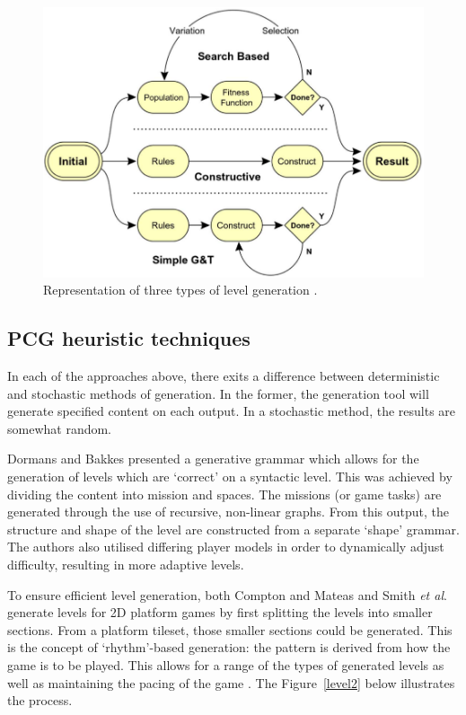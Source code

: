 \documentclass[11pt, a4paper, oneside]{report} %
\begin{document}
\begin{figure}[h!]

  \centering
    \includegraphics[scale=0.35]{lvlgenmethods}
  \caption{Representation of three types of level generation \cite{5756645}.}
  \label{level}
\end{figure}


\subsection{PCG heuristic techniques}

In each of the approaches above, there exits a difference between deterministic
and stochastic methods of generation. In the former, the generation tool will
generate specified content on each output. In a stochastic method, the results
are somewhat random.

Dormans and Bakkes \@\cite{dormans2011generating} presented a generative grammar
which allows for the generation of levels which are `correct' on a syntactic
level. This was achieved by dividing the content into mission and spaces. The
missions (or game tasks) are generated through the use of recursive, non-linear
graphs. From this output, the structure and shape of the level are constructed
from a separate `shape' grammar. The authors also utilised differing player
models in order to dynamically adjust difficulty, resulting in more adaptive
levels.


To ensure efficient level generation, both Compton and Mateas
\cite{compton2006procedural} and Smith \textit{et al}.
\cite{Smith:2009:RLG:1536513.1536548} generate levels for 2D platform games by
first splitting the levels into smaller sections. From a platform tileset, those
smaller sections could be generated. This is the concept of `rhythm'-based
generation: the pattern is derived from how the game is to be played. This
allows for a range of the types of generated levels as well as maintaining the
pacing of the game \cite{Smith:2009:RLG:1536513.1536548}. The
Figure~\ref{level2} below illustrates the process.
\end{document}
